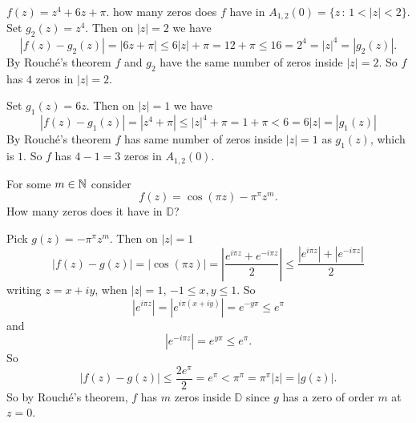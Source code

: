 \documentclass[10pt, a4paper]{article}
\begin{document}
\begin{example}
    $f(z) = z ^ 4 + 6z + \pi$.
    how many zeros does $f$ have in $A_{1, 2}(0) = \{z\,:\, 1 < |z| < 2\}$.
    Set $g_2(z) = z ^ 4$.
    Then on $|z| = 2$ we have
    \[
    |f(z) - g_2(z)| = |6z + \pi| \leq 6|z| + \pi = 12 + \pi \leq 16 = 2 ^ 4 = |z| ^ 4 = |g_2(z)|.
    \]
    By Rouché's theorem $f$ and $g_2$ have the same number of zeros inside $|z| = 2$.
    So $f$ has $4$ zeros in $|z| = 2$.

    Set $g_1(z) = 6z$.
    Then on $|z| = 1$ we have
    \[
    |f(z) - g_1(z)| = |z ^ 4 + \pi| \leq |z| ^ 4 + \pi = 1 + \pi < 6 = 6|z| = |g_1(z)|
    \]
    By Rouché's theorem $f$ has same number of zeros inside $|z| = 1$ as $g_1(z)$,
    which is $1$.
    So $f$ has $4 - 1 = 3$ zeros in $A_{1, 2}(0)$.
\end{example}

\begin{example}
    For some $m \in \mathbb{N}$ consider
    \[
    f(z) = \cos(\pi z) - \pi ^ {\pi}z ^ m.
    \]
    How many zeros does it have in $\mathbb{D}$?

    Pick $g(z) = -\pi ^ {\pi}z ^ m$.
    Then on $|z| = 1$
    \[
    |f(z) - g(z)| = |\cos(\pi z)| = \left|\frac{e ^ {i\pi z} + e ^ {-i\pi z}}{2}\right| \leq \frac{|e ^ {i\pi z}| + |e ^ {-i\pi z}|}{2}
    \]
    writing $z = x + iy$,
    when $|z| = 1$,
    $-1 \leq x, y \leq 1$.
    So
    \[
    |e ^ {i\pi z}| = |e ^ {i\pi(x + iy)}| = e ^ {-y\pi} \leq e ^ {\pi}
    \]
    and
    \[
    |e ^ {-i\pi z}| = e ^ {y\pi} \leq e ^ {\pi}.
    \]
    So
    \[
    |f(z) - g(z)| \leq \frac{2e ^ {\pi}}{2} = e ^ {\pi} < \pi ^ {\pi} = \pi ^ {\pi}|z| = |g(z)|.
    \]
    So by Rouché's theorem,
    $f$ has $m$ zeros inside $\mathbb{D}$ since $g$ has a zero of order $m$ at $z = 0$.
\end{example}
\end{document}
